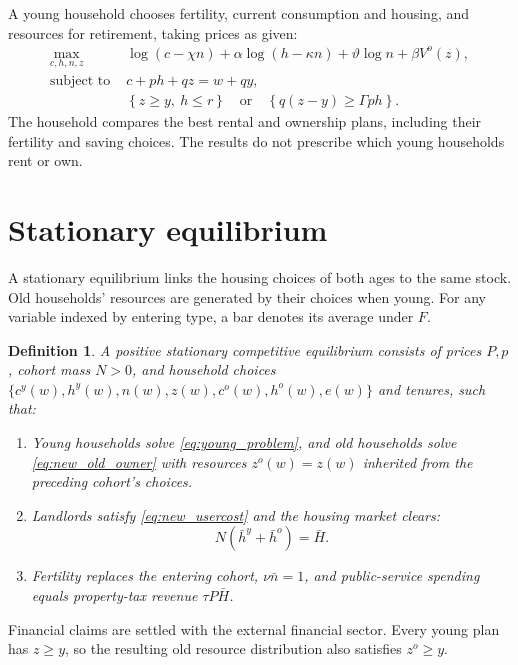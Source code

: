 \documentclass[11pt]{article}
\newtheorem{definition}{Definition}
\begin{document}
A young household chooses fertility, current consumption and housing, and
resources for retirement, taking prices as given:
\begin{equation}
\begin{split}
\max_{c,h,n,z}\;&\log(c-\chi n)+\alpha\log(h-\kappa n)
                  +\vartheta\log n+\beta V^o(z),\\
\text{subject to }&c+ph+qz=w+qy,\\
&\left\{z\ge y,\ h\le r\right\}
\quad\text{or}\quad\left\{q(z-y)\ge\Gamma ph\right\}.
\end{split}
\label{eq:young_problem}
\end{equation}
The household compares the best rental and ownership plans, including their
fertility and saving choices. The results do not prescribe which young
households rent or own.

\section{Stationary equilibrium}

A stationary equilibrium links the housing choices of both ages to the same
stock. Old households' resources are generated by their choices when young.
For any variable indexed by entering type, a bar denotes its average under $F$.

\begin{definition}
A positive stationary competitive equilibrium consists of prices $P,p$,
cohort mass $N>0$, and household choices
$\{c^y(w),h^y(w),n(w),z(w),c^o(w),h^o(w),e(w)\}$ and tenures, such that:
\begin{enumerate}
\item Young households solve \eqref{eq:young_problem}, and old households
solve \eqref{eq:new_old_owner} with resources $z^o(w)=z(w)$ inherited from
the preceding cohort's choices.
\item Landlords satisfy \eqref{eq:new_usercost} and the housing market clears:
\begin{equation}
N(\bar h^y+\bar h^o)=\bar H.
\label{eq:clearing}
\end{equation}
\item Fertility replaces the entering cohort, $\nu\bar n=1$, and
public-service spending equals property-tax revenue $\tau P\bar H$.
\end{enumerate}
\end{definition}
Financial claims are settled with the external financial sector. Every young
plan has $z\ge y$, so the resulting old resource distribution also satisfies
$z^o\ge y$.
\end{document}
